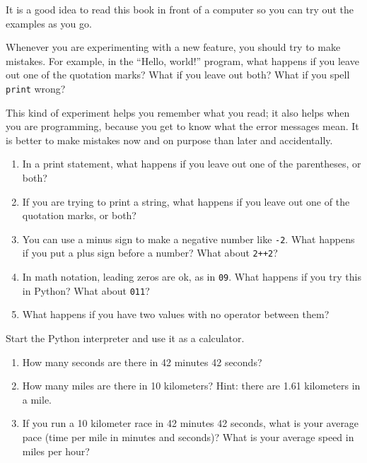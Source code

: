 \documentclass[10pt]{book}
\begin{document}
\begin{exercise}

It is a good idea to read this book in front of a computer so you can
try out the examples as you go.

Whenever you are experimenting with a new feature, you should try
to make mistakes.  For example, in the ``Hello, world!'' program,
what happens if you leave out one of the quotation marks?  What
if you leave out both?  What if you spell {\tt print} wrong?

This kind of experiment helps you remember what you read; it also
helps when you are programming, because you get to know what the error
messages mean.  It is better to make mistakes now and on purpose than
later and accidentally.

\begin{enumerate}

\item In a print statement, what happens if you leave out one
of the parentheses, or both?

\item If you are trying to print a string, what happens if you
leave out one of the quotation marks, or both?

\item You can use a minus sign to make a negative number like
{\tt -2}.  What happens if you put a plus sign before a number?
What about {\tt 2++2}?

\item In math notation, leading zeros are ok, as in {\tt 09}.
What happens if you try this in Python?  What about {\tt 011}?

\item What happens if you have two values with no operator
between them?

\end{enumerate}

\end{exercise}



\begin{exercise}

Start the Python interpreter and use it as a calculator.

\begin{enumerate}

\item How many seconds are there in 42 minutes 42 seconds?

\item How many miles are there in 10 kilometers?  Hint: there are 1.61
  kilometers in a mile.

\item If you run a 10 kilometer race in 42 minutes 42 seconds, what is
  your average pace (time per mile in minutes and seconds)?  What is
  your average speed in miles per hour?


\end{enumerate}

\end{exercise}
\end{document}
